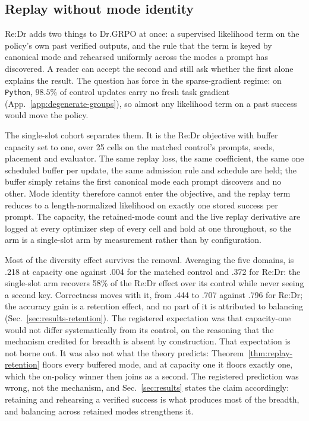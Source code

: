 \subsection{Replay without mode identity}
\label{app:mode-agnostic-replay}

Re:Dr adds two things to Dr.GRPO at once: a supervised likelihood term on the
policy's own past verified outputs, and the rule that the term is keyed by
canonical mode and rehearsed uniformly across the modes a prompt has
discovered. A reader can accept the second and still ask whether the first
alone explains the result. The question has force in the sparse-gradient
regime: on \texttt{Python}, $98.5\%$ of control updates carry no fresh task
gradient (App.~\ref{app:degenerate-groups}), so almost any likelihood term on
a past success would move the policy.

The single-slot cohort separates them. It is the Re:Dr objective with buffer
capacity set to one, over 25 cells on the matched control's prompts,
seeds, placement and evaluator. The same replay loss, the same coefficient,
the same one scheduled buffer per update, the same admission rule and schedule
are held; the buffer simply retains the first canonical mode each prompt
discovers and no other. Mode identity therefore cannot enter the objective,
and the replay term reduces to a length-normalized likelihood on exactly one
stored success per prompt. The capacity, the retained-mode count and the
live replay derivative are logged at every optimizer step of every cell and
hold at one throughout, so the arm is a single-slot arm by measurement rather
than by configuration.

Most of the diversity effect survives the removal. Averaging the five domains,
\pmd{} is .218 at capacity one against .004 for the matched
control and .372 for Re:Dr: the single-slot arm recovers
58\% of the Re:Dr effect over its control while never seeing a
second key. Correctness moves with it, from .444 to .707
against .796 for Re:Dr; the accuracy gain is a retention effect,
and no part of it is attributed to balancing (Sec.~\ref{sec:results-retention}). The registered expectation was that
capacity-one \pmd{} would not differ systematically from its control, on the
reasoning that the mechanism credited for breadth is absent by construction.
That expectation is not borne out. It was also not what the theory predicts:
Theorem~\ref{thm:replay-retention} floors every buffered mode, and at capacity
one it floors exactly one, which the on-policy winner then joins as a second.
The registered prediction was wrong, not the mechanism, and
Sec.~\ref{sec:results} states the claim accordingly: retaining and rehearsing a
verified success is what produces most of the breadth, and balancing across
retained modes strengthens it.

